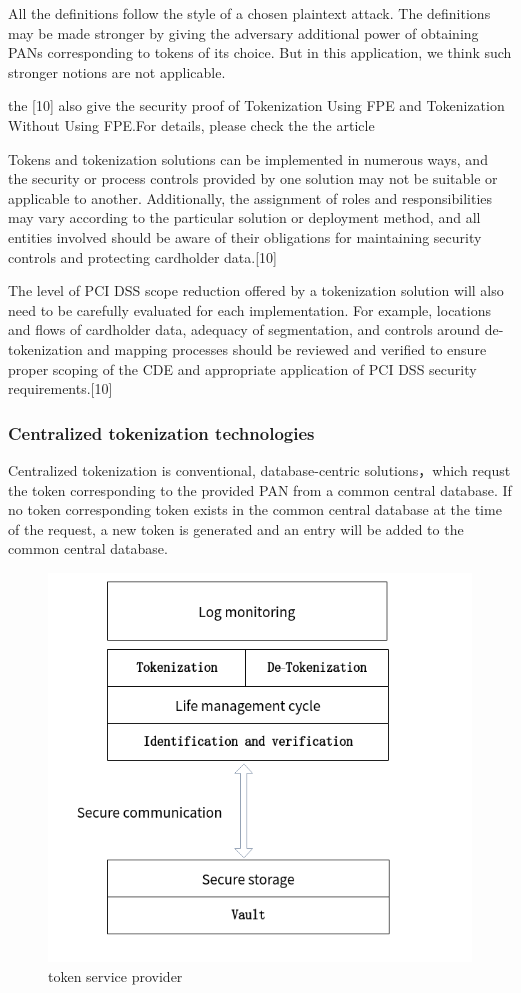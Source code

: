 \documentclass[journal]{IEEEtran}
\begin{document}
All the definitions follow the style of a chosen plaintext attack. The definitions may be made stronger by giving the adversary additional power of obtaining PANs corresponding to tokens of its choice. But in this application, we think such stronger notions are not applicable.

the [10] also give the security proof of Tokenization Using FPE and Tokenization Without Using FPE.For details, please check the the article

Tokens and tokenization solutions can be implemented in numerous ways, and the security or process controls provided by one solution may not be suitable or applicable to another. Additionally, the assignment of roles and responsibilities may vary according to the particular solution or deployment method, and all entities involved should be aware of their obligations for maintaining security controls and protecting cardholder data.[10]

The level of PCI DSS scope reduction offered by a tokenization solution will also need to be carefully evaluated for each implementation. For example, locations and flows of cardholder data, adequacy of segmentation, and controls around de-tokenization and mapping processes should be reviewed and verified to ensure proper scoping of the CDE and appropriate application of PCI DSS security requirements.[10]
\subsubsection{Centralized tokenization technologies}
Centralized tokenization is conventional, database-centric solutions，which requst the token corresponding to the provided PAN from a common central database. If no token corresponding token exists in the common central database at the time of the request, a new token is generated and an entry will be added to the common central database.


\begin{figure}[htbp]
\centerline{\includegraphics[scale=0.4]{tsp.png}}
\caption{token service provider}
\label{fig}
\end{figure}
 
\end{document}
